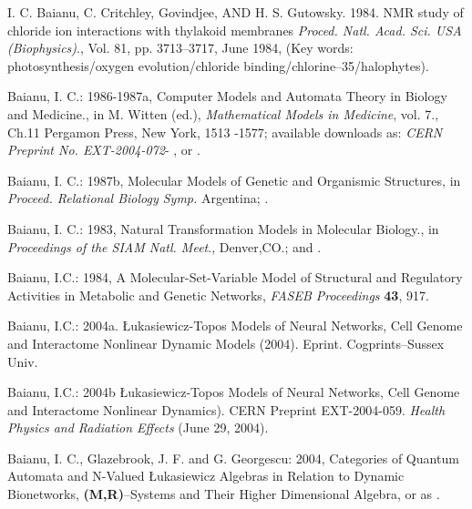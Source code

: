 \documentclass[12pt]{article}
\theoremstyle{plain}
\theoremstyle{definition}
\numberwithin{equation}{section}
\newcommand{\<}{{\langle}}
\begin{document}
\begin{thebibliography}{9}
I. C. Baianu, C. Critchley, Govindjee, AND H. S. Gutowsky. 1984.
NMR study of chloride ion interactions with thylakoid membranes
{\em Proced. Natl. Acad. Sci. USA (Biophysics)}., Vol. 81, pp. 3713--3717, June 1984,
(Key words: photosynthesis/oxygen evolution/chloride binding/chlorine--35/halophytes).


Baianu, I. C.: 1986-1987a, Computer Models and Automata Theory in Biology and Medicine., in M. Witten (ed.), \emph{Mathematical Models in Medicine}, vol. 7., Ch.11 Pergamon Press, New York, 1513 -1577;
available downloads as: \emph{CERN Preprint No. EXT-2004-072}-
, or
 .

Baianu, I. C.: 1987b, Molecular Models of Genetic and Organismic Structures, in \emph{Proceed. Relational Biology Symp.}
Argentina; .

Baianu, I. C.: 1983, Natural Transformation Models in Molecular Biology., in \emph{Proceedings of the SIAM Natl. Meet}., Denver,CO.;  and
.

Baianu, I.C.: 1984, A Molecular-Set-Variable Model of Structural and Regulatory Activities in Metabolic and Genetic Networks, \emph{FASEB Proceedings} \textbf{43}, 917.

Baianu, I.C.: 2004a. \L{}ukasiewicz-Topos Models of Neural Networks, Cell Genome and Interactome Nonlinear Dynamic Models (2004). Eprint. Cogprints--Sussex Univ.

Baianu, I.C.: 2004b \L{}ukasiewicz-Topos Models of Neural Networks, Cell Genome and Interactome Nonlinear Dynamics). CERN Preprint EXT-2004-059. \textit{Health Physics and Radiation Effects} (June 29, 2004).

Baianu, I. C., Glazebrook, J. F. and G. Georgescu: 2004, Categories of Quantum Automata and N-Valued \L ukasiewicz Algebras in Relation to Dynamic Bionetworks, \textbf{(M,R)}--Systems and Their Higher Dimensional Algebra,  or
as .


\end{thebibliography}
\end{document}
